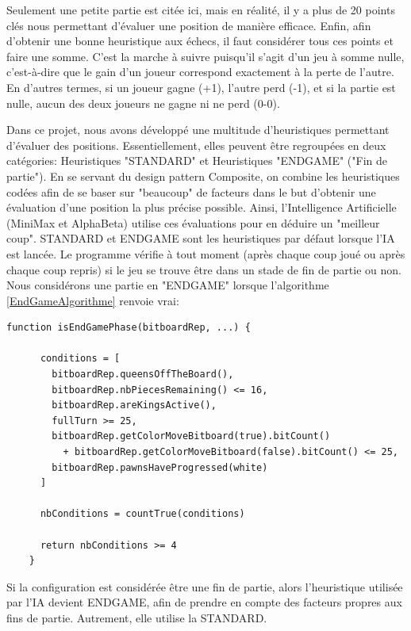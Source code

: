 \documentclass{article}
\begin{document}
Seulement une petite partie est citée ici, mais en réalité, il y a plus de 20 points clés nous permettant d'évaluer une position de manière efficace.
Enfin, afin d'obtenir une bonne heuristique aux échecs, il faut considérer tous ces points et faire une somme. C'est la marche à suivre puisqu'il 
s'agit d'un jeu à somme nulle, c'est-à-dire que le gain d'un joueur correspond exactement à la perte de l'autre. En d'autres termes, si un joueur gagne 
(+1), l'autre perd (-1), et si la partie est nulle, aucun des deux joueurs ne gagne ni ne perd (0-0).

Dans ce projet, nous avons développé une multitude d'heuristiques permettant d'évaluer des positions. Essentiellement, elles peuvent être regroupées
en deux catégories: Heuristiques "STANDARD" et Heuristiques "ENDGAME" ("Fin de partie"). En se servant du design pattern Composite, on combine les
heuristiques codées afin de se baser sur "beaucoup" de facteurs dans le but d'obtenir une évaluation d'une position la plus précise possible. Ainsi,
l'Intelligence Artificielle (MiniMax et AlphaBeta) utilise ces évaluations pour en déduire un "meilleur coup". STANDARD et ENDGAME sont les 
heuristiques par défaut lorsque l'IA est lancée. Le programme vérifie à tout moment (après chaque coup joué ou après chaque coup repris)
si le jeu se trouve être dans un stade de fin de partie ou non.
Nous considérons une partie en "ENDGAME" lorsque l'algorithme \ref{EndGameAlgorithme} renvoie vrai:

\begin{lstlisting}[label={EndGameAlgorithme}, caption={Détection de la phase de fin de partie - pseudo-code}]
    function isEndGamePhase(bitboardRep, ...) {
    
      conditions = [
        bitboardRep.queensOffTheBoard(),
        bitboardRep.nbPiecesRemaining() <= 16,
        bitboardRep.areKingsActive(),
        fullTurn >= 25,
        bitboardRep.getColorMoveBitboard(true).bitCount()
          + bitboardRep.getColorMoveBitboard(false).bitCount() <= 25,
        bitboardRep.pawnsHaveProgressed(white)
      ]
    
      nbConditions = countTrue(conditions)
    
      return nbConditions >= 4
    }
    \end{lstlisting}

Si la configuration est considérée être une fin de partie, alors l'heuristique utilisée
par l'IA devient ENDGAME, afin de prendre en compte des facteurs propres aux fins de partie. Autrement, elle utilise la STANDARD.
\end{document}
